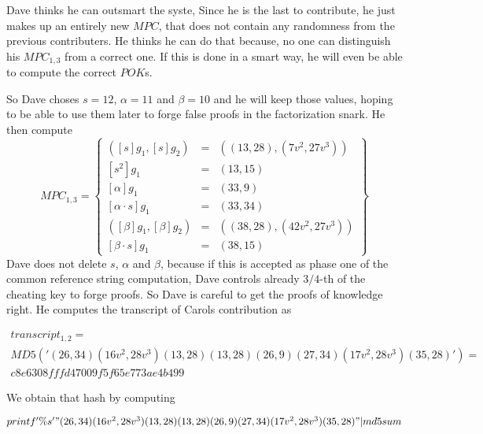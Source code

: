 \begin{example}
Dave thinks he can outsmart the syste, Since he is the last to contribute, he just makes up an entirely new $MPC$, that does not contain any randomness from the previous contributers. He thinks he can do that because, no one can distinguish his $MPC_{1,3}$ from a correct one. If this is done in a smart way, he will even be able to compute the correct $POK$s. 

So Dave choses $s=12$, $\alpha=11$ and $\beta=10$ and he will keep those values, hoping to be able to use them later to forge false proofs in the factorization snark. He then compute  
$$
MPC_{1,3}= \left\{
\begin{array}{lcl}
([s]g_1, [s]g_2) &=& ((13,28),(7v^2,27v^3))\\ 
{}[s^2] g_1 &=& (13,15)\\
{}[\alpha]g_1 &=& (33,9)\\ 
{}[\alpha\cdot s]g_1 &=& (33,34)\\ 
([\beta]g_1,[\beta]g_2) &=& ((38,28),(42v^2,27v^3))\\ 
{}[\beta \cdot s]g_1 &=& (38,15)
\end{array}
\right\}
$$
Dave does not delete $s$, $\alpha$ and $\beta$, because if this is accepted as phase one of the common reference string computation, Dave controls already $3/4$-th of the cheating key to forge proofs. So Dave is careful to get the proofs of knowledge right. He computes the transcript of Carols contribution as 

\begin{multline*}
transcript_{1,2}=\\ 
MD5('
(26,34)(16v^2,28v^3)(13,28)(13,28)(26,9)(27,34)(17v^2,28v^3)(35,28)') =\\ c8e6308fffd47009f5f65e773ae4b499
\end{multline*}

We obtain that hash by computing

$printf '\%s' "(26,34)(16v^2,28v^3)(13,28)(13,28)(26,9)(27,34)(17v^2,28v^3)(35,28)" | md5sum$

\end{example}
